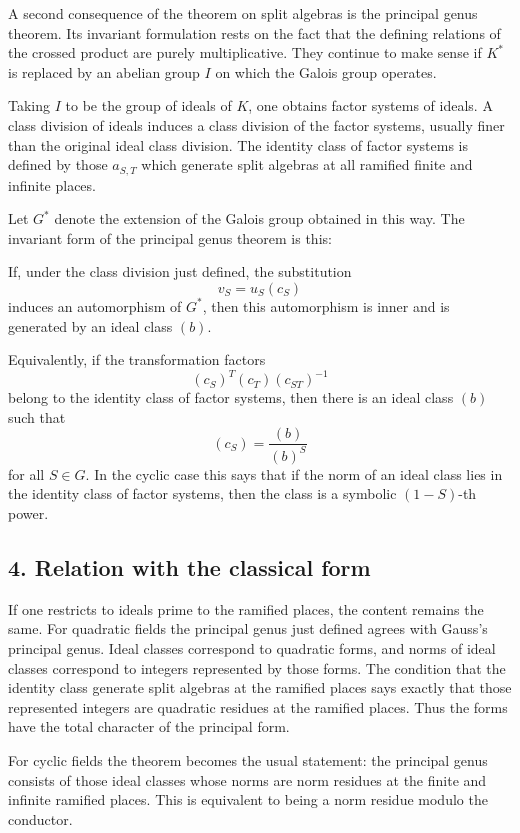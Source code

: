 \documentclass[
  11pt,
]{article}
\begin{document}
A second consequence of the theorem on split algebras is the principal
genus theorem. Its invariant formulation rests on the fact that the
defining relations of the crossed product are purely multiplicative.
They continue to make sense if \(K^*\) is replaced by an abelian group
\(I\) on which the Galois group operates.

Taking \(I\) to be the group of ideals of \(K\), one obtains factor
systems of ideals. A class division of ideals induces a class division
of the factor systems, usually finer than the original ideal class
division. The identity class of factor systems is defined by those
\(a_{S,T}\) which generate split algebras at all ramified finite and
infinite places.

Let \(G^*\) denote the extension of the Galois group obtained in this
way. The invariant form of the principal genus theorem is this:

If, under the class division just defined, the substitution \[
  v_S=u_S(c_S)
\] induces an automorphism of \(G^*\), then this automorphism is inner
and is generated by an ideal class \((b)\).

Equivalently, if the transformation factors \[
  (c_S)^T(c_T)(c_{ST})^{-1}
\] belong to the identity class of factor systems, then there is an
ideal class \((b)\) such that \[
  (c_S)=\frac{(b)}{(b)^S}
\] for all \(S\in G\). In the cyclic case this says that if the norm of
an ideal class lies in the identity class of factor systems, then the
class is a symbolic \((1-S)\)-th power.

\subsection{4. Relation with the classical
form}\label{relation-with-the-classical-form}

If one restricts to ideals prime to the ramified places, the content
remains the same. For quadratic fields the principal genus just defined
agrees with Gauss's principal genus. Ideal classes correspond to
quadratic forms, and norms of ideal classes correspond to integers
represented by those forms. The condition that the identity class
generate split algebras at the ramified places says exactly that those
represented integers are quadratic residues at the ramified places. Thus
the forms have the total character of the principal form.

For cyclic fields the theorem becomes the usual statement: the principal
genus consists of those ideal classes whose norms are norm residues at
the finite and infinite ramified places. This is equivalent to being a
norm residue modulo the conductor.
\end{document}
